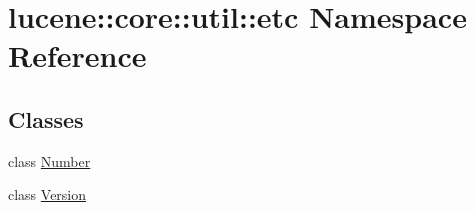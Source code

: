 \hypertarget{namespacelucene_1_1core_1_1util_1_1etc}{}\section{lucene\+:\+:core\+:\+:util\+:\+:etc Namespace Reference}
\label{namespacelucene_1_1core_1_1util_1_1etc}
\subsection*{Classes}
\begin{DoxyCompactItemize}
\item 
class \mbox{\hyperlink{classlucene_1_1core_1_1util_1_1etc_1_1Number}{Number}}
\item 
class \mbox{\hyperlink{classlucene_1_1core_1_1util_1_1etc_1_1Version}{Version}}
\end{DoxyCompactItemize}
